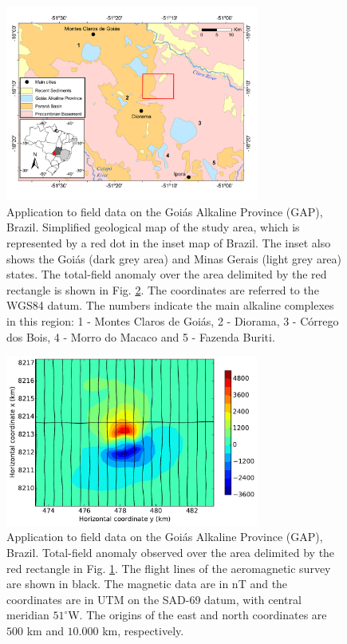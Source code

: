 \documentclass[journal abbreviation, npg]{copernicus}
\begin{document}
\begin{figure}[t]
\vspace*{2mm}
\begin{center}
\includegraphics[width=8.3cm]{Figures/geology_study_area.png}
\end{center}
\caption{Application to field data on the Goiás Alkaline Province (GAP), Brazil. Simplified geological map of the study area, which is represented by a red dot in the inset map of Brazil. The inset also shows the Goiás (dark grey area) and Minas Gerais (light grey area) states. The total-field anomaly over the area delimited by the red rectangle is shown in Fig. \ref{fig:TFA-Diorama}. The coordinates are referred to the WGS84 datum. The numbers indicate the main alkaline complexes in this region: 1 - Montes Claros de Goiás, 2 - Diorama, 3 - Córrego dos Bois, 4 - Morro do Macaco and 5 - Fazenda Buriti.}
\label{fig:geology-study-area}
\end{figure}

\begin{figure}[t]
\vspace*{2mm}
\begin{center}
\includegraphics[width=8.3cm]{Figures/TFA_Diorama.pdf}
\end{center}
\caption{Application to field data on the Goiás Alkaline Province (GAP), Brazil. Total-field anomaly observed over the area delimited by the red rectangle in Fig. \ref{fig:geology-study-area}. The flight lines of the aeromagnetic survey are shown in black. The magnetic data are in nT and the coordinates are in UTM on the SAD-69 datum, with central meridian $51^{\circ}$W. The origins of the east and north coordinates are $500$ km and $10.000$ km, respectively.}
\label{fig:TFA-Diorama}
\end{figure}
\end{document}
